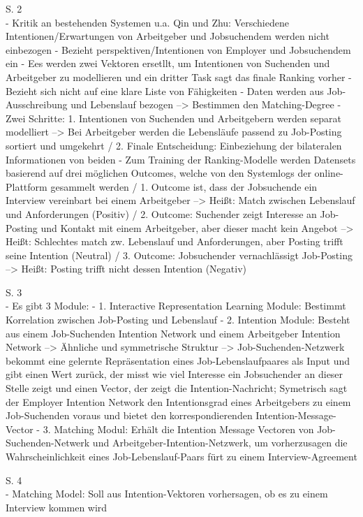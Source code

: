 S. 2\\
- Kritik an bestehenden Systemen u.a. Qin und Zhu: Verschiedene Intentionen/Erwartungen von Arbeitgeber und Jobsuchendem werden nicht einbezogen
- Bezieht perspektiven/Intentionen von Employer und Jobsuchendem ein
- Ees werden zwei Vektoren ersetllt, um Intentionen von Suchenden und Arbeitgeber zu modellieren und ein dritter Task sagt das finale Ranking vorher
- Bezieht sich nicht auf eine klare Liste von Fähigkeiten
- Daten werden aus Job-Ausschreibung und Lebenslauf bezogen --> Bestimmen den Matching-Degree
- Zwei Schritte: 1. Intentionen von Suchenden und Arbeitgebern werden separat modelliert --> Bei Arbeitgeber werden die Lebensläufe passend zu Job-Posting sortiert und umgekehrt / 2. Finale Entscheidung: Einbeziehung der bilateralen Informationen von beiden
- Zum Training der Ranking-Modelle werden Datensets basierend auf drei möglichen Outcomes, welche von den Systemlogs der online-Plattform gesammelt werden / 1. Outcome ist, dass der Jobsuchende ein Interview vereinbart bei einem Arbeitgeber --> Heißt: Match zwischen Lebenslauf und Anforderungen (Positiv) / 2. Outcome: Suchender zeigt Interesse an Job-Posting und Kontakt mit einem Arbeitgeber, aber dieser macht kein Angebot --> Heißt: Schlechtes match zw. Lebenslauf und Anforderungen, aber Posting trifft seine Intention (Neutral) / 3. Outcome: Jobsuchender vernachlässigt Job-Posting --> Heißt: Posting trifft nicht dessen Intention (Negativ)

S. 3\\
- Es gibt 3 Module:
- 1. Interactive Representation Learning Module: Bestimmt Korrelation zwischen Job-Posting und Lebenslauf
- 2. Intention Module: Besteht aus einem Job-Suchenden Intention Network und einem Arbeitgeber Intention Network --> Ähnliche und symmetrische Struktur --> Job-Suchenden-Netzwerk bekommt eine gelernte Repräsentation eines Job-Lebenslaufpaares als Input und gibt einen Wert zurück, der misst wie viel Interesse ein Jobsuchender an dieser Stelle zeigt und einen Vector, der zeigt die Intention-Nachricht; Symetrisch sagt der Employer Intention Network den Intentionsgrad eines Arbeitgebers zu einem Job-Suchenden voraus und bietet den korrespondierenden Intention-Message-Vector
- 3. Matching Modul: Erhält die Intention Message Vectoren von Job-Suchenden-Netwerk und Arbeitgeber-Intention-Netzwerk, um vorherzusagen die Wahrscheinlichkeit eines Job-Lebenslauf-Paars fürt zu einem Interview-Agreement

S. 4\\
- Matching Model: Soll aus Intention-Vektoren vorhersagen, ob es zu einem Interview kommen wird

